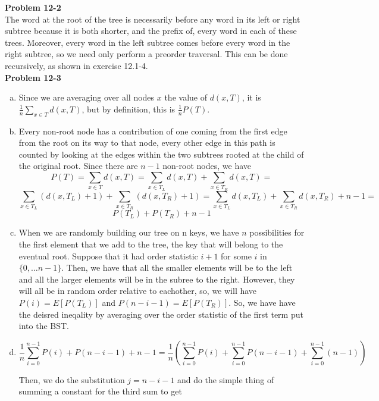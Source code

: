 \documentclass{article}
\begin{document}
\noindent\textbf{Problem 12-2}\\

The word at the root of the tree is necessarily before any word in its left or right subtree because it is both shorter, and the prefix of, every word in each of these trees.  Moreover, every word in the left subtree comes before every word in the right subtree, so we need only perform a preorder traversal.  This can be done recursively, as shown in exercise 12.1-4. \\


\noindent\textbf{Problem 12-3} \\

\begin{enumerate}[a.]
\item
Since we are averaging over all nodes $x$ the value of $d(x,T)$, it is $\frac{1}{n} \sum_{x\in T} d(x,T)$, but by definition, this is $\frac{1}{n} P(T)$.

\item
Every non-root node has a contribution of one coming from the first edge from the root on its way to that node, every other edge in this path is counted by looking at the edges within the two subtrees rooted at the child of the original root. Since there are $n-1$ non-root nodes, we have
\[
P(T) = \sum_{x\in T} d(x,T) = \sum_{x\in T_L} d(x,T) + \sum_{x\in T_R} d(x,T) =\]\[ \sum_{x\in T_L} (d(x,T_L)+1) + \sum_{x\in T_R}(d(x,T_R)+1) = \sum_{x\in T_L}d(x,T_L) + \sum_{x\in T_R}d(x,T_R) + n-1 =\]\[ P(T_L) + P(T_R) +n-1
\]

\item
When we are randomly building our tree on n keys, we have $n$ possibilities for the first element that we add to the tree, the key that will belong to the eventual root. Suppose that it had order statistic $i+1$ for some $i$ in $\{0,\ldots  n-1\}$. Then, we have that all the smaller elements will be to the left and all the larger elements will be in the subree to the right. However, they will all be in random order relative to eachother, so, we will have $P(i) = E[P(T_L)]$ and $P(n-i-1) = E[P(T_R)]$. So, we have have the deisred ineqality by averaging over the order statistic of the first term put into the BST.

\item
\[
\frac{1}{n} \sum_{i=0}^{n-1} P(i) + P(n-i-1) + n-1 = \frac{1}{n}\left(\sum_{i=0}^{n-1}P(i) + \sum_{i=0}^{n-1}P(n-i-1) + \sum_{i=0}^{n-1}(n-1)\right)
\]

Then, we do the substitution $j = n-i-1$ and do the simple thing of summing a constant for the third sum to get


\end{enumerate}
\end{document}
